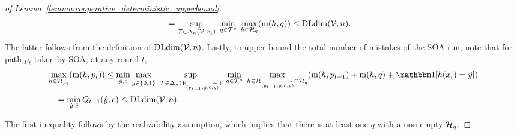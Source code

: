 \documentclass[anon]{alt2027} %
\begin{document}
\begin{proof}[of Lemma~\ref{lemma:cooperative_deterministic_upperbound}]
\begin{align*}
&= \sup_{{\mathcal T}\in\Delta_n({\mathcal V},x_1)} ~\min_{q\in{\mathcal T}^\rho} ~\max_{h\in {{\mathcal H}}_q} (\mathrm{m}(h,q)) \leq \mathrm{DLdim}({\mathcal V}, n).
\end{align*}
The latter follows from the definition of $\mathrm{DLdim}({\mathcal V}, n)$.
Lastly, to upper bound the total number of mistakes of the SOA run, note that for path $p_t$ taken by SOA, at any round $t$,
\begin{align*}
&\max_{h\in \H_{p_t}} (\mi(h, p_t)) \leq 
\min_{\hy,\sc} \max_{\vy\in\{0,1\}} ~\sup_{\T\in\Delta_n(\V_{(p_{t-1},\hy, \sc, \vy)})} ~\min_{q\in\T^\rho} ~\max_{h\in \H_{(p_{t-1},\hy, \sc, \vy)}\cap \H_q} (\mi(h, p_{t-1}) + \mi(h,q)+\indct[h(x_t) = \hy]) \\
&\quad= \min_{\hy,\sc}Q_{t-1}(\hy, \sc) \leq \dldim(\V, n).
\end{align*}


The first inequality follows by the realizability assumption, which implies that there is at least one $q$ with a non-empty ${{\mathcal H}}_q$. 
\end{proof}
\end{document}

